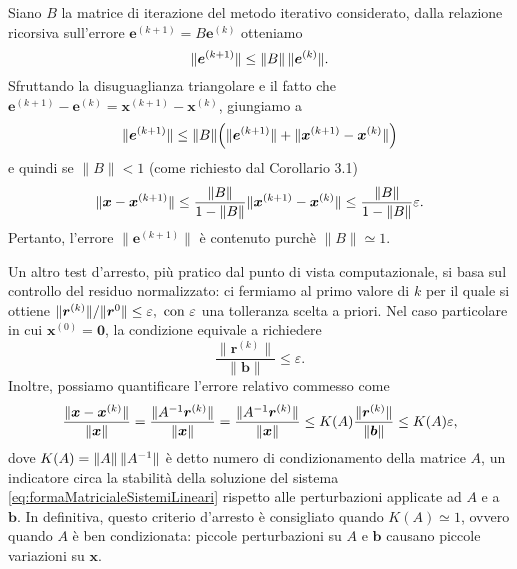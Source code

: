 Siano $B$ la matrice di iterazione del metodo iterativo considerato, dalla relazione ricorsiva sull'errore $\bm{e}^{(k+1)}= B\bm{e}^{(k)}$ otteniamo
\begin{equation}
    \lVert\bm{e}^{(k+1)}\rVert \le \lVert B\rVert\,\lVert\bm{e}^{(k)}\rVert.
\end{equation}
Sfruttando la disuguaglianza triangolare e il fatto che $\bm{e}^{(k+1)} - \bm{e}^{(k)} = \bm{x}^{(k+1)} - \bm{x}^{(k)}$, giungiamo a
\begin{equation*}
    \lVert\bm{e}^{(k+1)}\rVert \le \lVert B\rVert\Big(\lVert\bm{e}^{(k+1)}\rVert + \lVert\bm{x}^{(k+1)} - \bm{x}^{(k)}\rVert\Big)
\end{equation*}
e quindi se $\|B\|<1$ (come richiesto dal Corollario 3.1)
\begin{equation}
    \lVert\bm{x} - \bm{x}^{(k+1)}\rVert\le \frac{\lVert B\rVert}{1 - \lVert B\rVert}\lVert\bm{x}^{(k+1)} - \bm{x}^{(k)}\rVert \le  \frac{\lVert B\rVert}{1 - \lVert B\rVert} \varepsilon.
\end{equation}
Pertanto, l'errore  $\|\bm{e}^{(k+1)}\|$ \`e contenuto purch\`e $\|B\|\simeq 1$.

Un altro test d'arresto, pi\`u pratico dal punto di vista computazionale, si basa sul controllo del residuo normalizzato: ci fermiamo al primo valore di $k$
per il quale si ottiene $\lVert\bm{r}^{(k)}\rVert/{\lVert\bm{r}^{0}\rVert} \le \varepsilon, \text{ con } \varepsilon$ una tolleranza scelta a priori.\newline
Nel caso particolare in cui $\bm{x}^{(0)} = \bm{0}$, la condizione equivale a richiedere
\begin{equation*}
    \frac{\|\bm{r}^{(k)}\|}{\|\bm{b}\|} \le \varepsilon.
\end{equation*}
Inoltre, possiamo quantificare l'errore relativo commesso come
\begin{equation*}
    \frac{\lVert\bm{x}-\bm{x}^{(k)}\rVert}{\lVert\bm{x}\rVert} = \frac{\lVert A^{-1}\bm{r}^{(k)}\rVert}{\lVert\bm{x}\rVert} = \frac{\lVert A^{-1}\bm{r}^{(k)}\rVert}{\lVert\bm{x}\rVert} \le K(A) \frac{\lVert\bm{r}^{(k)}\rVert}{\lVert\bm{b}\rVert} \le K(A)\varepsilon,
\end{equation*}
dove $K(A)=\lVert A\rVert\,\lVert A^{-1}\rVert$ \`e detto numero di condizionamento della matrice $A$, un indicatore circa la stabilit\`a della soluzione del sistema \eqref{eq:formaMatricialeSistemiLineari} rispetto alle perturbazioni applicate ad $A$ e a $\bm{b}$.\newline
In definitiva, questo criterio d'arresto \`e consigliato quando $K(A)\simeq 1$, ovvero quando $A$ \`e ben condizionata: piccole perturbazioni su $A \text{ e } \bm{b}$ causano piccole variazioni su $\bm{x}$.